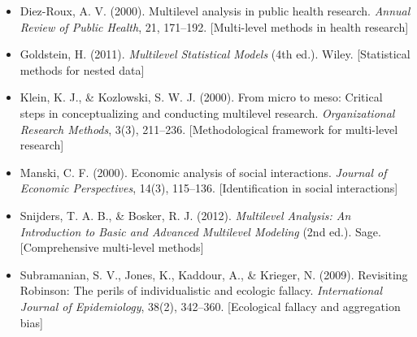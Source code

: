 \begin{itemize}

\item Diez-Roux, A. V. (2000). 
Multilevel analysis in public health research. 
\textit{Annual Review of Public Health}, 21, 171--192.
[Multi-level methods in health research]

\item Goldstein, H. (2011). 
\textit{Multilevel Statistical Models} (4th ed.). 
Wiley.
[Statistical methods for nested data]

\item Klein, K. J., \& Kozlowski, S. W. J. (2000). 
From micro to meso: Critical steps in conceptualizing and conducting multilevel research. 
\textit{Organizational Research Methods}, 3(3), 211--236.
[Methodological framework for multi-level research]

\item Manski, C. F. (2000). 
Economic analysis of social interactions. 
\textit{Journal of Economic Perspectives}, 14(3), 115--136.
[Identification in social interactions]

\item Snijders, T. A. B., \& Bosker, R. J. (2012). 
\textit{Multilevel Analysis: An Introduction to Basic and Advanced Multilevel Modeling} (2nd ed.). 
Sage.
[Comprehensive multi-level methods]

\item Subramanian, S. V., Jones, K., Kaddour, A., \& Krieger, N. (2009). 
Revisiting Robinson: The perils of individualistic and ecologic fallacy. 
\textit{International Journal of Epidemiology}, 38(2), 342--360.
[Ecological fallacy and aggregation bias]

\end{itemize}




